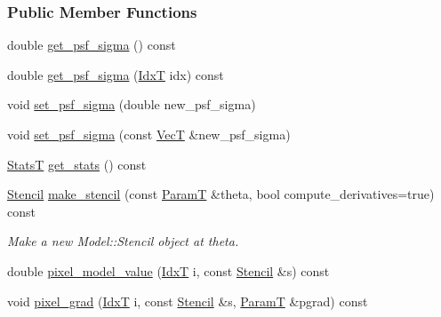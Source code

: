 \subsubsection*{Public Member Functions}
\begin{DoxyCompactItemize}
\item 
double \hyperlink{classmappel_1_1Gauss1DModel_a8786ff874e58de054ab3633a5f201192}{get\+\_\+psf\+\_\+sigma} () const 
\item 
double \hyperlink{classmappel_1_1Gauss1DModel_ae7bd64fb97894f9657be0a4b542aa3c6}{get\+\_\+psf\+\_\+sigma} (\hyperlink{namespacemappel_ab17ec0f30b61ece292439d7ece81d3a8}{IdxT} idx) const 
\item 
void \hyperlink{classmappel_1_1Gauss1DModel_a5c09d4cf98de58fb67d881b560e6a3e8}{set\+\_\+psf\+\_\+sigma} (double new\+\_\+psf\+\_\+sigma)
\item 
void \hyperlink{classmappel_1_1Gauss1DModel_accb0aad54534660e5acd2d6fc01268f1}{set\+\_\+psf\+\_\+sigma} (const \hyperlink{namespacemappel_a2225ad69f358daa3f4f99282a35b9a3a}{VecT} \&new\+\_\+psf\+\_\+sigma)
\item 
\hyperlink{namespacemappel_a04ab395b0cf82c4ce68a36b2212649a5}{StatsT} \hyperlink{classmappel_1_1Gauss1DModel_a61904b6e14e7429ee58175cb54259ed9}{get\+\_\+stats} () const 
\item 
\hyperlink{classmappel_1_1Gauss1DModel_1_1Stencil}{Stencil} \hyperlink{classmappel_1_1Gauss1DModel_a3068438846f29467b2df5a8504151c20}{make\+\_\+stencil} (const \hyperlink{classmappel_1_1PointEmitterModel_a665ec6aea3aac139bb69a23c06d4b9a1}{ParamT} \&theta, bool compute\+\_\+derivatives=true) const 
\begin{DoxyCompactList}\small\item\em Make a new Model\+::\+Stencil object at theta. \end{DoxyCompactList}\item 
double \hyperlink{classmappel_1_1Gauss1DModel_af26feda273232841ae28b85b0dbab439}{pixel\+\_\+model\+\_\+value} (\hyperlink{namespacemappel_ab17ec0f30b61ece292439d7ece81d3a8}{IdxT} i, const \hyperlink{classmappel_1_1Gauss1DModel_1_1Stencil}{Stencil} \&s) const 
\item 
void \hyperlink{classmappel_1_1Gauss1DModel_ae17d888bf89ea80c39c9839144015b55}{pixel\+\_\+grad} (\hyperlink{namespacemappel_ab17ec0f30b61ece292439d7ece81d3a8}{IdxT} i, const \hyperlink{classmappel_1_1Gauss1DModel_1_1Stencil}{Stencil} \&s, \hyperlink{classmappel_1_1PointEmitterModel_a665ec6aea3aac139bb69a23c06d4b9a1}{ParamT} \&pgrad) const 
\item 

\end{DoxyCompactItemize}
